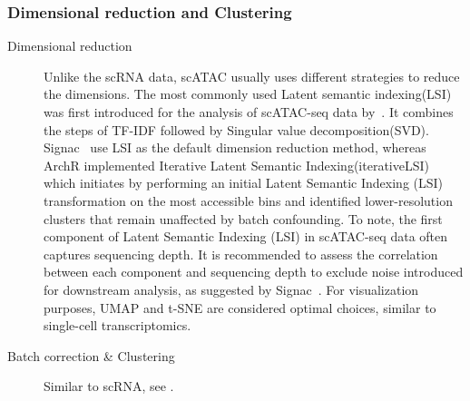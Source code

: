 \subsubsection{Dimensional reduction and Clustering}
\begin{description}
	\item[Dimensional reduction]
	Unlike the scRNA data, scATAC usually uses different strategies to reduce the dimensions. The most commonly used Latent semantic indexing(LSI) was first introduced for the analysis of scATAC-seq data by~\citep{cusanovich2015multiplex}. It combines the steps of TF-IDF followed by Singular value decomposition(SVD). Signac~\citep{signac} use LSI as the default dimension reduction method, whereas ArchR implemented Iterative Latent Semantic Indexing(iterativeLSI)~\citep{satpathy2019massively, granja2019single} which initiates by performing an initial Latent Semantic Indexing (LSI) transformation on the most accessible bins and identified lower-resolution clusters that remain unaffected by batch confounding. To note, the first component of Latent Semantic Indexing (LSI) in scATAC-seq data often captures sequencing depth. It is recommended to assess the correlation between each component and sequencing depth to exclude noise introduced for downstream analysis, as suggested by Signac~\citep{signac}. For visualization purposes, UMAP and t-SNE are considered optimal choices, similar to single-cell transcriptomics.

	\item[Batch correction \& Clustering]
	Similar to scRNA, see .



\end{description}
